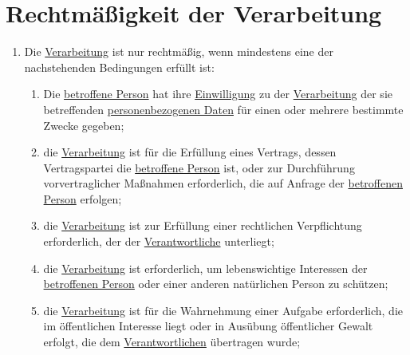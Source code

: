 \chapter{Rechtmäßigkeit der Verarbeitung}
\label{ch:6}


\begin{enumerate}

  \item Die \hyperref[itm:04-2]{Verarbeitung} ist nur rechtmäßig, wenn mindestens eine der nachstehenden Bedingungen
   erfüllt ist:%
  \label{itm:06-1}

  \begin{enumerate}
  
    \item Die \hyperref[itm:04-1]{betroffene Person} hat ihre \hyperref[itm:04-11]{Einwilligung} zu der \hyperref[itm:04-2]{Verarbeitung} der
     sie betreffenden \hyperref[itm:04-1]{personenbezogenen Daten} für einen oder mehrere bestimmte Zwecke gegeben;%
    \label{itm:06-1a}

    \item die \hyperref[itm:04-2]{Verarbeitung} ist für die Erfüllung eines Vertrags, dessen Vertragspartei die \hyperref[itm:04-1]{betroffene Person} ist, oder zur
     Durchführung vorvertraglicher Maßnahmen erforderlich, die auf Anfrage der \hyperref[itm:04-1]{betroffenen Person}
     erfolgen;%
    \label{itm:06-1b}

    \item die \hyperref[itm:04-2]{Verarbeitung} ist zur Erfüllung einer rechtlichen Verpflichtung erforderlich, der
     der \hyperref[itm:04-7]{Verantwortliche} unterliegt;%
    \label{itm:06-1c}

    \item die \hyperref[itm:04-2]{Verarbeitung} ist erforderlich, um lebenswichtige Interessen der \hyperref[itm:04-1]
     {betroffenen Person} oder einer anderen natürlichen Person zu schützen;%
    \label{itm:06-1d}

    \item die \hyperref[itm:04-2]{Verarbeitung} ist für die Wahrnehmung einer Aufgabe erforderlich, die im öffentlichen
     Interesse liegt oder in Ausübung
     öffentlicher Gewalt erfolgt, die dem \hyperref[itm:04-7]{Verantwortlichen} übertragen wurde;%
    \label{itm:06-1e}


\end{enumerate}
\end{enumerate}
